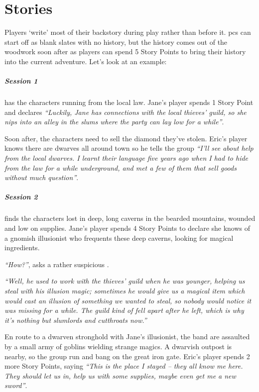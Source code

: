 \chapter{Stories}\label{stories}

\begin{multicols}{2}

\noindent
Players `write' most of their backstory during play rather than before it.  \Glspl{pc} can start off as blank slates with no history, but the history comes out of the woodwork soon after as players can spend 5 Story Points to bring their history into the current adventure.  Let's look at an example:

\paragraph{Session 1} has the characters running from the local law.  Jane's player spends 1 Story Point and declares \textit{``Luckily, Jane has connections with the local thieves' guild, so she nips into an alley in the slums where the party can lay low for a while''}.

Soon after, the characters need to sell the diamond they've stolen.
Eric's player knows there are dwarves all around town so he tells the group \textit{``I'll see about help from the local dwarves.
I learnt their language five years ago when I had to hide from the law for a while underground, and met a few of them that sell goods without much question''}.

\paragraph{Session 2} finds the characters lost in deep, long caverns in the bearded mountains, wounded and low on supplies.  Jane's player spends 4 Story Points to declare she knows of a gnomish illusionist who frequents these deep caverns, looking for magical ingredients.

\textit{``How?''}, asks a rather suspicious .

\textit{``Well, he used to work with the thieves' guild when he was younger, helping us steal with his illusion magic; sometimes he would give us a magical item which would cast an illusion of something we wanted to steal, so nobody would notice it was missing for a while.
The guild kind of fell apart after he left, which is why it's nothing but slumlords and cutthroats now.''}

En route to a dwarven stronghold with Jane's illusionist, the band are assaulted by a small army of goblins wielding strange magics.
A dwarvish outpost is nearby, so the group run and bang on the great iron gate.  Eric's player spends 2 more Story Points, saying \textit{``This is the place I stayed -- they all know me here.  They should let us in, help us with some supplies, maybe even get me a new sword''}.


\end{multicols}
